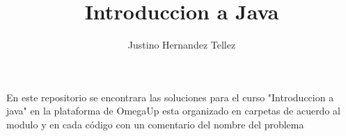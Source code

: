 \documentclass{article}
\title{Introduccion a Java}
\author{Justino Hernandez Tellez}
\begin{document}
  \maketitle
 En este repositorio se encontrara las soluciones para el curso "Introduccion a java" en la plataforma de 
 OmegaUp esta organizado en carpetas de acuerdo al modulo y en cada código con un comentario del nombre del problema
\end{document}
